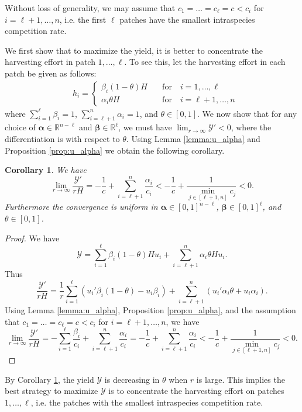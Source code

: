 \documentclass[11pt]{article}
\newtheorem{corollary}[theorem]{Corollary}
\def\YY{\mathcal{Y}}
\theoremstyle{definition}
\begin{document}
Without loss of generality, we may assume that $c_1=\dots=c_{\ell}=c<c_i$ for $i=\ell+1,\dots,n$, i.e. the first $\ell$ patches have the smallest intraspecies competition rate.

We first show that to maximize the yield, it is better to concentrate the harvesting effort in patch $1,\dots,\ell$. To see this, let the harvesting effort in each patch be given as follows:
\begin{align}\label{hiY}
&h_i=\begin{cases}
    \beta_i(1-\theta)H \quad &\text{for} \quad i=1,\dots,\ell\\
    \alpha_i\theta H \quad &\text{for} \quad i=\ell+1,\dots,n
\end{cases}
\end{align}
where $\sum_{i=1}^\ell \beta_i=1$, $\sum_{i=\ell+1}^n \alpha_i=1$, and $\theta\in[0,1]$. We now show that for any choice of $\bm\alpha \in \mathbb{R}^{n-\ell}$ and $\bm\beta\in\mathbb{R}^\ell$, we must have $\lim_{r\to\infty}\YY'<0$, where the differentiation is with respect to $\theta$. Using Lemma \ref{lemma:u_alpha} and Proposition \ref{prop:u_alpha} we obtain the following corollary.

\begin{corollary}\label{cor:YY'}
    We have 
    \[
    \lim_{r\to\infty}\frac{\YY'}{rH} =-\frac{1}{c}+\sum_{i=\ell+1}^n \frac{\alpha_i}{c_i} <-\frac{1}{c}+\frac{1}{\min_{j\in[\ell+1,n]}c_j} <0.
    \]
Furthermore the convergence is uniform in $\bm\alpha\in [0, 1]^{n-\ell}$, $\bm\beta\in[0,1]^{\ell}$, and $\theta\in [0, 1]$.
\end{corollary}
\begin{proof}
We have
    \[
    \YY=\sum_{i=1}^\ell \beta_i(1-\theta)Hu_i+\sum_{i=\ell+1}^n \alpha_i\theta H u_i.
    \]
Thus
\[
\frac{\YY'}{rH}=\frac{1}{r}\sum_{i=1}^\ell (u_i'\beta_i(1-\theta)-u_i\beta_i)+\sum_{i=\ell+1}^n (u_i'\alpha_i \theta + u_i\alpha_i).
\]
Using Lemma \ref{lemma:u_alpha}, Proposition \ref{prop:u_alpha}, and the assumption that $c_1=\dots=c_\ell=c<c_i$ for $i=\ell+1,\dots,n$, we have 
\[
\lim_{r\to\infty} \frac{\YY'}{rH} = -\sum_{i=1}^\ell \frac{\beta_i}{c_i}+\sum_{i=\ell+1}^n\frac{\alpha_i}{c_i} =-\frac{1}{c}+\sum_{i=\ell+1}^n \frac{\alpha_i}{c_i} <-\frac{1}{c}+\frac{1}{\min_{j\in[\ell+1,n]}c_j} <0.
\]
\end{proof}


By Corollary \ref{cor:YY'}, the yield $\YY$ is decreasing in $\theta$ when $r$ is large. This implies the best strategy to maximize $\YY$ is to concentrate the harvesting effort on patches $1,\dots,\ell$, i.e. the patches with the smallest intraspecies competition rate.
\end{document}
